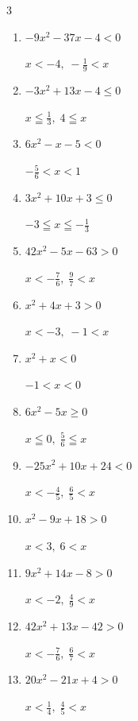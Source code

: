 \begin{multicols}{3}
\begin{enumerate}
  \item $-9x^{2}-37x-4<0$

        $\displaystyle x < -4 , \; -\frac{1}{9} < x$

  \item $-3x^{2}+13x-4\leq 0$

        $\displaystyle x \leqq \frac{1}{3} , \; 4 \leqq x$

  \item $6x^{2}-x-5<0$

        $\displaystyle -\frac{5}{6} < x < 1$

  \item $3x^{2}+10x+3\leq 0$

        $\displaystyle -3 \leqq x \leqq -\frac{1}{3}$

  \item $42x^{2}-5x-63>0$

        $\displaystyle x < -\frac{7}{6} , \; \frac{9}{7} < x$

  \item $x^{2}+4x+3>0$

        $\displaystyle x < -3 , \; -1 < x$

  \item $x^{2}+x<0$

        $\displaystyle -1 < x < 0$

  \item $6x^{2}-5x\geq 0$

        $\displaystyle x \leqq 0 , \; \frac{5}{6} \leqq x$

  \item $-25x^{2}+10x+24<0$

        $\displaystyle x < -\frac{4}{5} , \; \frac{6}{5} < x$

\columnbreak %

  \item $x^{2}-9x+18>0$

        $\displaystyle x < 3 , \; 6 < x$

  \item $9x^{2}+14x-8>0$

        $\displaystyle x < -2 , \; \frac{4}{9} < x$

  \item $42x^{2}+13x-42>0$

        $\displaystyle x < -\frac{7}{6} , \; \frac{6}{7} < x$

  \item $20x^{2}-21x+4>0$

        $\displaystyle x < \frac{1}{4} , \; \frac{4}{5} < x$


\end{enumerate}
\end{multicols}
